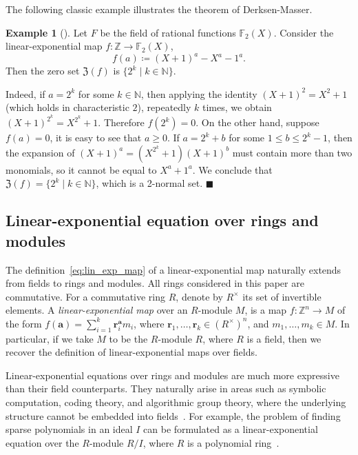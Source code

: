 \documentclass[letterpaper, 11pt, thm-restate]{article}
\numberwithin{equation}{section}
\newcommand{\Z}{\mathbb{Z}}
\newcommand{\N}{\mathbb{N}}
\newcommand{\F}{\mathbb{F}}
\newcommand{\mZ}{\mathfrak{Z}}
\newcommand{\ba}{\boldsymbol{a}}
\newcommand{\br}{\boldsymbol{r}}
\theoremstyle{definition}
\theoremstyle{definition}
\newtheorem{example}[theorem]{Example}
\theoremstyle{definition}
\begin{document}
The following classic example illustrates the theorem of Derksen-Masser.

\begin{example}[{\cite[Example~1.3]{derksen2007skolem}}]\label{example:Derksen}
    Let $F$ be the field of rational functions $\F_2(X)$.
    Consider the linear-exponential map $f \colon \Z \rightarrow \F_2(X)$,
    \begin{equation}\label{eq:exampleDerksen}
    f(a) \coloneqq (X+1)^a - X^a - 1^a.
    \end{equation}
    Then the zero set $\mZ(f)$ is $\{2^k \mid k \in \N\}$.
    
    Indeed, if $a = 2^k$ for some $k \in \N$, then applying the identity $(X+1)^2 = X^2 + 1$ (which holds in characteristic $2$), repeatedly $k$ times, we obtain $(X+1)^{2^k} = X^{2^k} + 1$.
    Therefore $f(2^k) = 0$.
    On the other hand, suppose $f(a) = 0$, it is easy to see that $a \geq 0$.
    If $a = 2^k + b$ for some $1 \leq b \leq 2^k-1$, then the expansion of $(X+1)^a = (X^{2^k}+1)(X+1)^b$ must contain more than two monomials, so it cannot be equal to $X^a + 1^a$.
    We conclude that $\mZ(f) = \{2^k \mid k \in \N\}$, which is a 2-normal set.
    \hfill $\blacksquare$
\end{example}

\subsection{Linear-exponential equation over rings and modules}
The definition~\eqref{eq:lin_exp_map} of a linear-exponential map naturally extends from fields to rings and modules.
All rings considered in this paper are commutative.
For a commutative ring $R$, denote by $R^{\times}$ its set of invertible elements.
A \emph{linear-exponential map} over an $R$-module $M$, is a map $f \colon \Z^n \rightarrow M$ of the form
$
    f(\ba)=\sum_{i = 1}^k\br_i^{\ba} m_i
$,
where $\br_1,\ldots,\br_k\in (R^{\times})^n$, and $m_1,\ldots,m_k\in M$.
In particular, if we take $M$ to be the $R$-module $R$, where $R$ is a field, then we recover the definition of linear-exponential maps over fields.

Linear-exponential equations over rings and modules are much more expressive than their field counterparts.
They naturally arise in areas such as symbolic computation, coding theory, and algorithmic group theory, where the underlying structure cannot be embedded into fields~\cite{AugotBardetFaugere2007, dong2025submonoid}. 
For example, the problem of finding sparse polynomials in an ideal $I$ can be formulated as a linear-exponential equation over the $R$-module $R/I$, where $R$ is a polynomial ring~\cite{jensen2017finding}.
\end{document}
